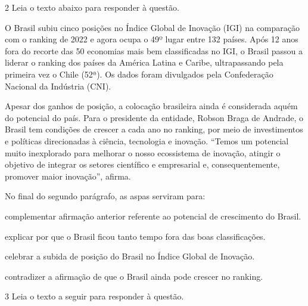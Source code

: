 \num{2} Leia o texto abaixo para responder à questão.

\begin{myquote}

O Brasil subiu cinco posições no Índice Global de Inovação (IGI) na comparação
com o ranking de 2022 e agora ocupa o 49º lugar entre 132 países. Após 12 anos
fora do recorte das 50 economias mais bem classificadas no IGI, o Brasil
passou a liderar o ranking dos países da América Latina e Caribe,
ultrapassando pela primeira vez o Chile (52ª). Os dados foram divulgados pela 
Confederação Nacional da Indústria (CNI).

Apesar dos ganhos de posição, a colocação brasileira ainda é considerada aquém 
do potencial do país. Para o presidente da entidade, Robson Braga de Andrade, 
o Brasil tem condições de crescer a cada ano no ranking, por meio de investimentos 
e políticas direcionadas à ciência, tecnologia e inovação. ``Temos um potencial muito
inexplorado para melhorar o nosso ecossistema de inovação, atingir o objetivo de 
integrar os setores científico e empresarial e, consequentemente, promover maior 
inovação'', afirma.


\end{myquote}

\pagebreak
No final do segundo parágrafo, as aspas serviram para:

\begin{escolha}

  \item complementar afirmação anterior referente ao potencial de crescimento do Brasil.

  \item explicar por que o Brasil ficou tanto tempo fora das boas classificações.

  \item celebrar a subida de posição do Brasil no Índice Global de Inovação.

  \item contradizer a afirmação de que o Brasil ainda pode crescer no ranking.

\end{escolha}


\num{3} Leia o texto a seguir para responder à questão. 

